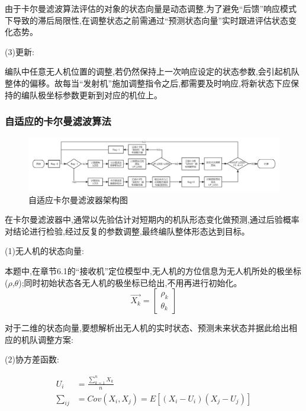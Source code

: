 \documentclass[withoutpreface,bwprint]{cumcmthesis}
\begin{document}
	由于卡尔曼滤波算法评估的对象的状态向量是动态调整,为了避免“后馈”响应模式下导致的滞后局限性,在调整状态之前需通过“预测状态向量”实时跟进评估状态变化态势。
	
	
	(3)更新:
	
	编队中任意无人机位置的调整,若仍然保持上一次响应设定的状态参数,会引起机队整体的偏移。故每当“发射机”施加调整指令之后,都需要及时响应,将新状态下应保持的编队极坐标参数更新到对应的机位上。
	
	\subsubsection{自适应的卡尔曼滤波算法}
	
	\begin{figure}[htbp!]
		\includegraphics[width=16.5cm]{./figures/6-10.png}
		\caption{自适应卡尔曼滤波器架构图}\label{fig:12}
	\end{figure}
	
	在卡尔曼滤波器中,通常以先验估计对短期内的机队形态变化做预测,通过后验概率对结论进行检验,经过反复的参数调整,最终编队整体形态达到目标。
	
	(1)无人机的状态向量:
	
	本题中,在章节6.1的“接收机”定位模型中,无人机的方位信息为无人机所处的极坐标($\rho$,$\theta$);同时初始状态各无人机的极坐标已给出,不用再进行初始化。
	\begin{equation}
		\tag{6-3-1}
		\vec{X_{k}} = \begin{bmatrix}
			\rho_{k}\\
			\theta_{k}
		\end{bmatrix}
	\end{equation}	
	
	对于二维的状态向量,要想解析出无人机的实时状态、预测未来状态并据此给出相应的机队调整方案:
	
	(2)协方差函数:
	
	\begin{equation}
		\tag{6-3-2}
		\begin{split}
			U_{i} & = \frac{\sum_{k=1}^{n} X_{k}}{n} \\
			\sum_{ij} & = Cov(X_{i},X_{j}) = E[(X_{i}-U_{i})(X_{j}-U_{j})]
		\end{split}
	\end{equation}
	
\end{document}
